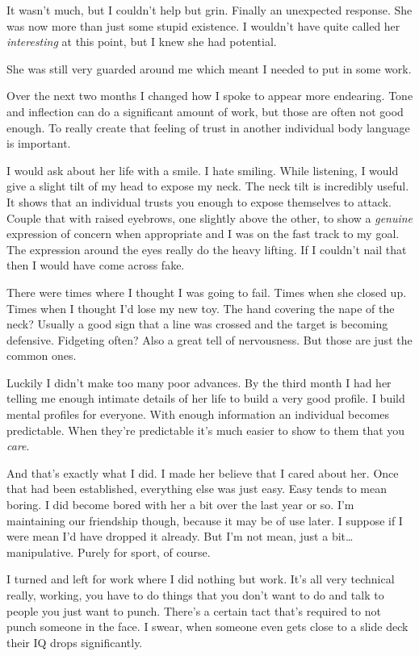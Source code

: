 \noindent
It wasn't much, but I couldn't help but grin.  Finally an unexpected response.
She was now more than just some stupid existence.
I wouldn't have quite called her \textit{interesting} at this point,
but I knew she had potential.
\VV


\noindent
She was still very guarded around me which meant I needed to put in some work.
\VV


\noindent
Over the next two months I changed how I spoke to appear more endearing.
Tone and inflection can do a significant amount of work, but those are often
not good enough.  To really create that feeling of trust in another individual
body language is important.


I would ask about her life with a smile.  I hate smiling.  While listening,
I would give a slight tilt of my head to expose my neck.  The neck tilt is
incredibly useful.  It shows that an individual trusts you enough to 
expose themselves to attack. Couple that with raised eyebrows,
one slightly above the other, to show a \textit{genuine} expression of
concern when appropriate and I was on the fast track to my goal.
The expression around the eyes really do the heavy lifting.
If I couldn't nail that then I would have come across fake.


There were times where I thought I was going to fail.  Times when she
closed up.  Times when I thought I'd lose my new toy.
The hand covering the nape of the neck?  Usually a good sign
that a line was crossed and the target is becoming defensive.
Fidgeting often? Also a great tell of nervousness.
But those are just the common ones.


Luckily I didn't make too many poor advances.  By the third month I had her
telling me enough intimate details of her life to build a very good profile.
I build mental profiles for everyone. With enough information
an individual becomes predictable. When they're predictable it's much
easier to show to them that you \textit{care}.


And that's exactly what I did.  I made her believe that I cared about her.
Once that had been established, everything else was just easy.  Easy tends
to mean boring.  I did become bored with her a bit over the last year or so.
I'm maintaining our friendship though, because it may be of use later.
I suppose if I were mean I'd have dropped it already.  But I'm not mean,
just a bit\ldots{}manipulative.  Purely for sport, of course.
\VV


\noindent
I turned and left for work where I did nothing but work.
It's all very technical really, working, you have to do
things that you don't want to do and talk to people you
just want to punch.  There's a certain tact that's
required to not punch someone in the face.
I swear, when someone even gets close to a slide deck
their IQ drops significantly.


